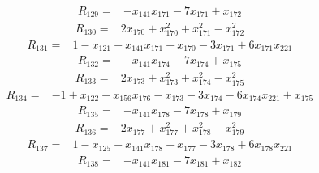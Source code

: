 \begin{equation*}\begin{split}
R_{129}={}&-x_{141} x_{171} - 7x_{171} + x_{172}
\end{split}\end{equation*}
\begin{equation*}\begin{split}
R_{130}={}&2x_{170} + x_{170}^{2} + x_{171}^{2} - x_{172}^{2}
\end{split}\end{equation*}
\begin{equation*}\begin{split}
R_{131}={}&1 - x_{121} - x_{141} x_{171} + x_{170} - 3x_{171} + 6x_{171} x_{221}
\end{split}\end{equation*}
\begin{equation*}\begin{split}
R_{132}={}&-x_{141} x_{174} - 7x_{174} + x_{175}
\end{split}\end{equation*}
\begin{equation*}\begin{split}
R_{133}={}&2x_{173} + x_{173}^{2} + x_{174}^{2} - x_{175}^{2}
\end{split}\end{equation*}
\begin{equation*}\begin{split}
R_{134}={}&-1 + x_{122} + x_{156} x_{176} - x_{173} - 3x_{174} - 6x_{174} x_{221} + x_{175}
\end{split}\end{equation*}
\begin{equation*}\begin{split}
R_{135}={}&-x_{141} x_{178} - 7x_{178} + x_{179}
\end{split}\end{equation*}
\begin{equation*}\begin{split}
R_{136}={}&2x_{177} + x_{177}^{2} + x_{178}^{2} - x_{179}^{2}
\end{split}\end{equation*}
\begin{equation*}\begin{split}
R_{137}={}&1 - x_{125} - x_{141} x_{178} + x_{177} - 3x_{178} + 6x_{178} x_{221}
\end{split}\end{equation*}
\begin{equation*}\begin{split}
R_{138}={}&-x_{141} x_{181} - 7x_{181} + x_{182}
\end{split}\end{equation*}
